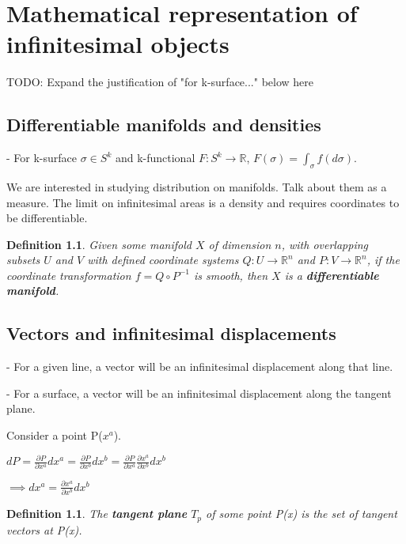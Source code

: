 \documentclass{book}
\newtheorem{defn}[equation]{Definition}
\begin{document}
\chapter{Mathematical representation of infinitesimal objects}

TODO: Expand the justification of "for k-surface..." below here

\section{Differentiable manifolds and densities}


- For k-surface $\sigma \in S^k$ and k-functional $F: S^k \to \mathbb{R}$, $F(\sigma) = \int_{\sigma}f(d\sigma)$. 

We are interested in studying distribution on manifolds. Talk about them as a measure. The limit on infinitesimal areas is a density and requires coordinates to be differentiable.


\begin{defn}
	Given some manifold $X$ of dimension $n$, with overlapping subsets $U$ and $V$ with defined coordinate systems $Q: U \to \mathbb{R}^n$ and $P: V \to \mathbb{R}^n$, if the coordinate transformation $f = Q \circ P^{-1}$ is smooth, then $X$ is a \textbf{differentiable manifold}. 
\end{defn}





\section{Vectors and infinitesimal displacements}

- For a given line, a vector will be an infinitesimal displacement along that line. 

- For a surface, a vector will be an infinitesimal displacement along the tangent plane. 


Consider a point P($x^a$).
 
$dP = \frac{\partial P}{\partial x^a} dx^a = \frac{\partial P}{\partial x^b} dx^b = \frac{\partial P}{\partial x^a}\frac{\partial x^a}{\partial x^b} dx^b$

$\implies dx^a = \frac{\partial x^a}{\partial x^b}dx^b $


\begin{defn}
	The \textbf{tangent plane} $T_p$ of some point P(x) is the set of tangent vectors at P(x). 
\end{defn}
 
\end{document}
